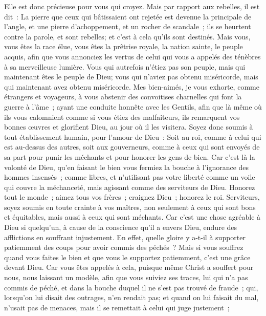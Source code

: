 \begin{multicols}{2}
Elle est donc précieuse pour vous qui croyez. Mais par rapport aux rebelles, il est dit~: La pierre que ceux qui bâtissaient ont rejetée est devenue la principale de l'angle,
et une pierre d'achoppement, et un rocher de scandale~; ils se heurtent contre la parole, et sont rebelles; et c'est à cela qu'ils sont destinés.
Mais vous, vous êtes la race élue, vous êtes la prêtrise royale, la nation sainte, le peuple acquis, afin que vous annonciez les vertus de celui qui vous a appelés des ténèbres à sa merveilleuse lumière.
Vous qui autrefois n'étiez pas son peuple, mais qui maintenant êtes le peuple de Dieu; vous qui n'aviez pas obtenu miséricorde, mais qui maintenant avez obtenu miséricorde.
Mes bien-aimés, je vous exhorte, comme étrangers et voyageurs, à vous abstenir des convoitises charnelles qui font la guerre à l'âme~;
ayant une conduite honnête avec les Gentils, afin que là même où ils vous calomnient comme si vous étiez des malfaiteurs, ils remarquent vos bonnes œuvres et glorifient Dieu, au jour où il les visitera.
Soyez donc soumis à tout établissement humain, pour l'amour de Dieu~: Soit au roi, comme à celui qui est au-dessus des autres,
soit aux gouverneurs, comme à ceux qui sont envoyés de sa part pour punir les méchants et pour honorer les gens de bien.
Car c'est là la volonté de Dieu, qu'en faisant le bien vous fermiez la bouche à l'ignorance des hommes insensés~;
comme libres, et n'utilisant pas votre liberté comme un voile qui couvre la méchanceté, mais agissant comme des serviteurs de Dieu.
Honorez tout le monde~; aimez tous vos frères~; craignez Dieu~; honorez le roi.
Serviteurs, soyez soumis en toute crainte à vos maîtres, non seulement à ceux qui sont bons et équitables, mais aussi à ceux qui sont méchants.
Car c'est une chose agréable à Dieu si quelqu'un, à cause de la conscience qu'il a envers Dieu, endure des afflictions en souffrant injustement.
En effet, quelle gloire y a-t-il à supporter patiemment des coups pour avoir commis des péchés~? Mais si vous souffrez quand vous faites le bien et que vous le supportez patiemment, c'est une grâce devant Dieu.
Car vous êtes appelés à cela, puisque même Christ a souffert pour nous, nous laissant un modèle, afin que vous suiviez ses traces,
lui qui n'a pas commis de péché, et dans la bouche duquel il ne s'est pas trouvé de fraude~;
qui, lorsqu'on lui disait des outrages, n'en rendait pas; et quand on lui faisait du mal, n'usait pas de menaces, mais il se remettait à celui qui juge justement~;

\end{multicols}
